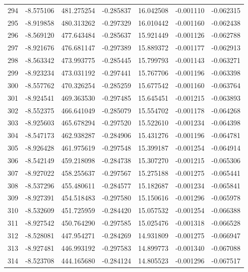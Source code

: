 \begin{tabular}{rrrrrrr}
 294 &  -8.575106 &  481.275254 & -0.285837 &  16.042508 &  -0.001110 & -0.062315 \\
 295 &  -8.919858 &  480.313262 & -0.297329 &  16.010442 &  -0.001160 & -0.062438 \\
 296 &  -8.569120 &  477.643484 & -0.285637 &  15.921449 &  -0.001126 & -0.062788 \\
 297 &  -8.921676 &  476.681147 & -0.297389 &  15.889372 &  -0.001177 & -0.062913 \\
 298 &  -8.563342 &  473.993775 & -0.285445 &  15.799793 &  -0.001143 & -0.063271 \\
 299 &  -8.923234 &  473.031192 & -0.297441 &  15.767706 &  -0.001196 & -0.063398 \\
 300 &  -8.557762 &  470.326254 & -0.285259 &  15.677542 &  -0.001160 & -0.063764 \\
 301 &  -8.924541 &  469.363530 & -0.297485 &  15.645451 &  -0.001215 & -0.063893 \\
 302 &  -8.552375 &  466.641049 & -0.285079 &  15.554702 &  -0.001178 & -0.064268 \\
 303 &  -8.925603 &  465.678294 & -0.297520 &  15.522610 &  -0.001234 & -0.064398 \\
 304 &  -8.547173 &  462.938287 & -0.284906 &  15.431276 &  -0.001196 & -0.064781 \\
 305 &  -8.926428 &  461.975619 & -0.297548 &  15.399187 &  -0.001254 & -0.064914 \\
 306 &  -8.542149 &  459.218098 & -0.284738 &  15.307270 &  -0.001215 & -0.065306 \\
 307 &  -8.927022 &  458.255637 & -0.297567 &  15.275188 &  -0.001275 & -0.065441 \\
 308 &  -8.537296 &  455.480611 & -0.284577 &  15.182687 &  -0.001234 & -0.065841 \\
 309 &  -8.927391 &  454.518483 & -0.297580 &  15.150616 &  -0.001296 & -0.065978 \\
 310 &  -8.532609 &  451.725959 & -0.284420 &  15.057532 &  -0.001254 & -0.066388 \\
 311 &  -8.927542 &  450.764290 & -0.297585 &  15.025476 &  -0.001318 & -0.066528 \\
 312 &  -8.528081 &  447.954271 & -0.284269 &  14.931809 &  -0.001275 & -0.066947 \\
 313 &  -8.927481 &  446.993192 & -0.297583 &  14.899773 &  -0.001340 & -0.067088 \\
 314 &  -8.523708 &  444.165680 & -0.284124 &  14.805523 &  -0.001296 & -0.067517 \\

\end{tabular}
